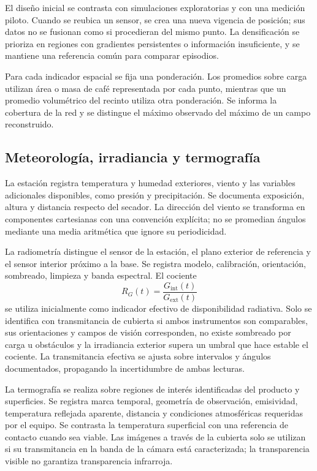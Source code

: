 El diseño inicial se contrasta con simulaciones exploratorias y con una medición piloto. Cuando se reubica un sensor, se crea una nueva vigencia de posición; sus datos no se fusionan como si procedieran del mismo punto. La densificación se prioriza en regiones con gradientes persistentes o información insuficiente, y se mantiene una referencia común para comparar episodios.

Para cada indicador espacial se fija una ponderación. Los promedios sobre carga utilizan área o masa de café representada por cada punto, mientras que un promedio volumétrico del recinto utiliza otra ponderación. Se informa la cobertura de la red y se distingue el máximo observado del máximo de un campo reconstruido.

\subsection{Meteorología, irradiancia y termografía}

La estación registra temperatura y humedad exteriores, viento y las variables adicionales disponibles, como presión y precipitación. Se documenta exposición, altura y distancia respecto del secador. La dirección del viento se transforma en componentes cartesianas con una convención explícita; no se promedian ángulos mediante una media aritmética que ignore su periodicidad.

La radiometría distingue el sensor de la estación, el plano exterior de referencia y el sensor interior próximo a la base. Se registra modelo, calibración, orientación, sombreado, limpieza y banda espectral. El cociente
\begin{equation}
R_G(t)=\frac{G_{\mathrm{int}}(t)}{G_{\mathrm{ext}}(t)}
\label{met:cociente_radiativo}
\end{equation}
se utiliza inicialmente como indicador efectivo de disponibilidad radiativa. Solo se identifica con transmitancia de cubierta si ambos instrumentos son comparables, sus orientaciones y campos de visión corresponden, no existe sombreado por carga u obstáculos y la irradiancia exterior supera un umbral que hace estable el cociente. La transmitancia efectiva se ajusta sobre intervalos y ángulos documentados, propagando la incertidumbre de ambas lecturas.

La termografía se realiza sobre regiones de interés identificadas del producto y superficies. Se registra marca temporal, geometría de observación, emisividad, temperatura reflejada aparente, distancia y condiciones atmosféricas requeridas por el equipo. Se contrasta la temperatura superficial con una referencia de contacto cuando sea viable. Las imágenes a través de la cubierta solo se utilizan si su transmitancia en la banda de la cámara está caracterizada; la transparencia visible no garantiza transparencia infrarroja.

